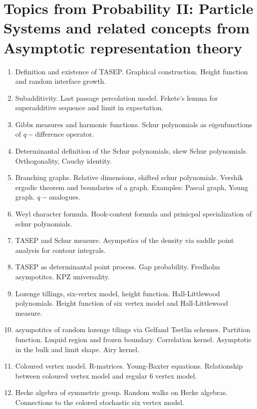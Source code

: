 \documentclass{article}
\begin{document}
\section*{Topics from Probability II: Particle Systems and related concepts from Asymptotic representation theory}
\begin{enumerate}
    \item Definition and existence of TASEP. Graphical construction. Height function and random interface growth. 
    \item Subadditivity. Last passage percolation model. Fekete's lemma for superadditive sequence and limit in expectation. 
    \item Gibbs measures and harmonic functions. Schur polynomials as eigenfunctions of $q-$difference operator.
    \item Determinantal definition of the Schur polynomials, skew Schur polynomials. Orthogonality, Cauchy identity.
    \item Branching graphs. Relative dimensions, shifted schur polynomials. Vershik ergodic theorem and boundaries of a graph.  Examples: Pascal graph, Young graph. $q-$analogues.
    \item Weyl character formula. Hook-content formula and prinicpal specialization of schur polynomials.
    \item TASEP and Schur measure. Asympotics of the density via saddle point analysis for contour integrals.
    \item TASEP as determinantal point process. Gap probability. Fredholm asympotitcs. KPZ universality.
    \item Lozenge tillings, six-vertex model, height function. Hall-Littlewood polynomials. Height function of six vertex model and Hall-Littlewood measure.
    \item asympotitcs of random lozenge tilings via Gelfand Tsetlin schemes. Partition function. Luquid region and frozen boundary. Correlation kernel. Asymptotic in the bulk and limit shape. Airy kernel.
    \item Coloured vertex model. R-matrices. Young-Baxter equations. Relationship between coloured vertex model and regular 6 vertex model.
    \item Hecke algebra of symmetric group. Random walks on Hecke algebras. Connections to the colored stochastic six vertex model.
\end{enumerate}



\nocite{*}
\end{document}
